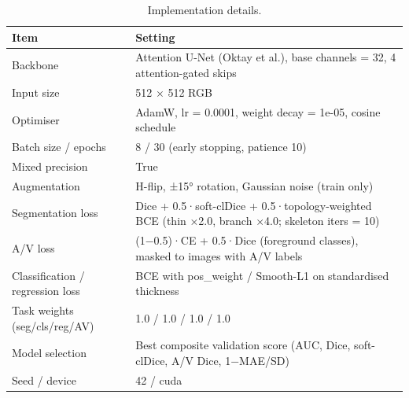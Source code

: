 \begin{table}
\caption{Implementation details.}
\label{tab:implementation_details}
\begin{tabular}{ll}
\toprule
Item & Setting \\
\midrule
Backbone & Attention U-Net (Oktay et al.), base channels = 32, 4 attention-gated skips \\
Input size & 512 × 512 RGB \\
Optimiser & AdamW, lr = 0.0001, weight decay = 1e-05, cosine schedule \\
Batch size / epochs & 8 / 30 (early stopping, patience 10) \\
Mixed precision & True \\
Augmentation & H-flip, ±15° rotation, Gaussian noise (train only) \\
Segmentation loss & Dice + 0.5·soft-clDice + 0.5·topology-weighted BCE (thin ×2.0, branch ×4.0; skeleton iters = 10) \\
A/V loss & (1−0.5)·CE + 0.5·Dice (foreground classes), masked to images with A/V labels \\
Classification / regression loss & BCE with pos\_weight / Smooth-L1 on standardised thickness \\
Task weights (seg/cls/reg/AV) & 1.0 / 1.0 / 1.0 / 1.0 \\
Model selection & Best composite validation score (AUC, Dice, soft-clDice, A/V Dice, 1−MAE/SD) \\
Seed / device & 42 / cuda \\
\bottomrule
\end{tabular}
\end{table}
